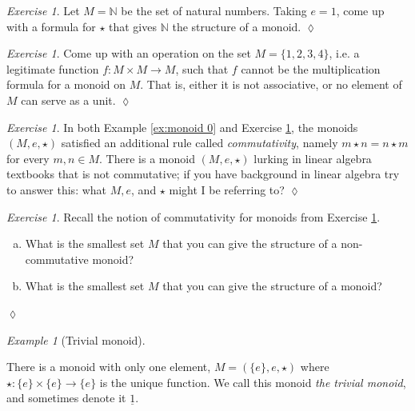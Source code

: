 \documentclass{book}
\def\NN{{\mathbb N}}
\def\to{\rightarrow}
\def\taking{\colon}
\def\ul{\underline}
\theoremstyle{remark}
\newtheorem{example}[subsubsection]{Example}
\newtheorem{exc}[subsubsection]{Exercise}
\newenvironment{exercise}{\begin{exc}}{\hspace*{\fill}$\lozenge$\end{exc}}
\theoremstyle{definition}
\def\sexc{\begin{enumerate}[a.)]\setlength{\itemsep}{.1cm}\setlength{\parskip}{.1cm}\item}
\def\next{\item}
\def\endsexc{\end{enumerate}}
\begin{document}
\begin{exercise}\label{exc:monoid 1}
Let $M=\NN$ be the set of natural numbers. Taking $e=1$, come up with a formula for $\star$ that gives $\NN$ the structure of a monoid.
\end{exercise}

\begin{exercise}
Come up with an operation on the set $M=\{1,2,3,4\}$, i.e. a legitimate function $f\taking M\times M\to M$, such that $f$ cannot be the multiplication formula for a monoid on $M$. That is, either it is not associative, or no element of $M$ can serve as a unit.
\end{exercise}

\begin{exercise}\label{ex:commutative monoid}
In both Example \ref{ex:monoid 0} and Exercise \ref{exc:monoid 1}, the monoids $(M,e,\star)$ satisfied an additional rule called {\em commutativity}, namely $m\star n=n\star m$ for every $m,n\in M$. There is a monoid $(M,e,\star)$ lurking in linear algebra textbooks that is not commutative; if you have background in linear algebra try to answer this: what $M, e$, and $\star$ might I be referring to?
\end{exercise}

\begin{exercise}
Recall the notion of commutativity for monoids from Exercise \ref{ex:commutative monoid}. 
\sexc What is the smallest set $M$ that you can give the structure of a non-commutative monoid? 
\next What is the smallest set $M$ that you can give the structure of a monoid?
\endsexc
\end{exercise}

\begin{example}[Trivial monoid]\label{ex:trivial monoid}

There is a monoid with only one element, $M=(\{e\},e,\star)$ where $\star\taking\{e\}\times\{e\}\to\{e\}$ is the unique function. We call this monoid {\em the trivial monoid}, and sometimes denote it $\ul{1}$.

\end{example}
\end{document}
